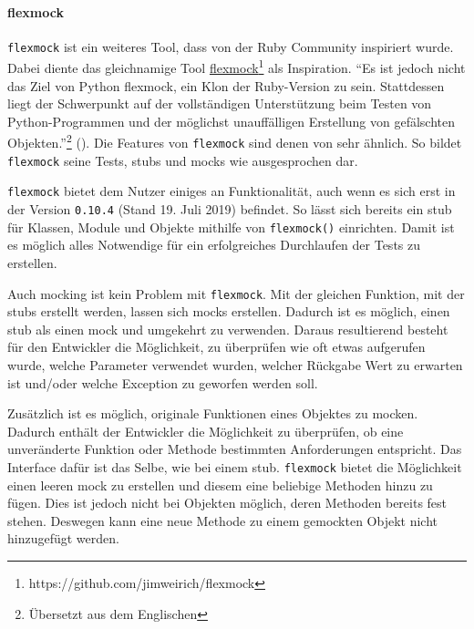 \newpage
\paragraph{flexmock}\label{python-tools:flexmock}\mbox{}
\newline
\lstinline{flexmock} ist ein weiteres Tool, dass von der Ruby Community
inspiriert wurde. Dabei diente das gleichnamige Tool
\href{https://github.com/jimweirich/flexmock}{flexmock}\footnote{https://github.com/jimweirich/flexmock}
als Inspiration. "`Es ist jedoch nicht das Ziel von Python flexmock, ein
Klon der Ruby-Version zu sein. Stattdessen liegt der Schwerpunkt auf der
vollständigen Unterstützung beim Testen von Python-Programmen und der möglichst
unauffälligen Erstellung von gefälschten Objekten."'\footnote{Übersetzt aus dem Englischen}
(\cite{flexmock:docs:0.10.3}). Die Features von \lstinline{flexmock} sind denen
von  sehr ähnlich. So bildet \lstinline{flexmock}
seine Tests, \Glspl{stub} und \Glspl{mock} wie ausgesprochen dar.
\newline

\lstinline{flexmock} bietet dem Nutzer einiges an Funktionalität, auch wenn es
sich erst in der Version \lstinline{0.10.4} (Stand 19. Juli 2019) befindet. So
lässt sich bereits ein \Gls{stub} für Klassen, Module und Objekte mithilfe von
\lstinline{flexmock()} einrichten. Damit ist es möglich alles Notwendige für
ein erfolgreiches Durchlaufen der Tests zu erstellen.

Auch \Gls{mock}ing ist kein Problem mit \lstinline{flexmock}. Mit der gleichen
Funktion, mit der \Glspl{stub} erstellt werden, lassen sich
\Glspl{mock} erstellen. Dadurch ist es möglich, einen \Gls{stub} als einen
\Gls{mock} und umgekehrt zu verwenden. Daraus resultierend besteht für den
Entwickler die Möglichkeit, zu überprüfen wie oft etwas aufgerufen wurde, welche
Parameter verwendet wurden, welcher Rückgabe Wert zu erwarten ist und/oder
welche Exception zu geworfen werden soll.

Zusätzlich ist es möglich, originale Funktionen eines Objektes zu
\gls{mock}en. Dadurch enthält der Entwickler die Möglichkeit
zu überprüfen, ob eine unveränderte Funktion oder Methode bestimmten
Anforderungen entspricht. Das Interface dafür ist das Selbe, wie bei einem
\Gls{stub}.
\lstinline{flexmock} bietet die Möglichkeit einen leeren \Gls{mock} zu
erstellen und diesem eine beliebige Methoden hinzu zu fügen. Dies ist jedoch
nicht bei Objekten möglich, deren Methoden bereits fest stehen. Deswegen kann
eine neue Methode zu einem gemockten Objekt nicht hinzugefügt werden.
\newline

